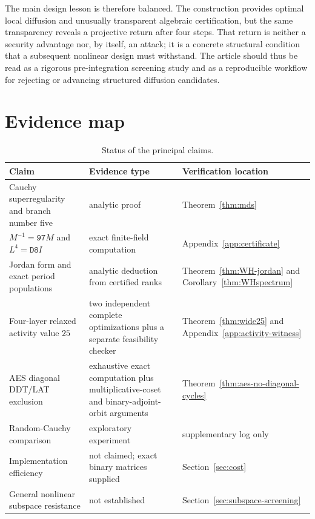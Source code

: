 \documentclass[10pt,reqno]{amsart}
\theoremstyle{plain}
\theoremstyle{remark}\newtheorem{remark}[theorem]{Remark}
\theoremstyle{definition}\newtheorem{definition}[theorem]{Definition}
\begin{document}
The main design lesson is therefore balanced. The construction provides optimal local diffusion and unusually transparent algebraic certification, but the same transparency reveals a projective return after four steps. That return is neither a security advantage nor, by itself, an attack; it is a concrete structural condition that a subsequent nonlinear design must withstand. The article should thus be read as a rigorous pre-integration screening study and as a reproducible workflow for rejecting or advancing structured diffusion candidates.

\section{Evidence map}\label{sec:evidence-map}
\begin{table}[ht]
\centering
\footnotesize
\caption{Status of the principal claims.}
\begin{tabularx}{\textwidth}{p{}p{}X}
\toprule
Claim & Evidence type & Verification location\\
\midrule
Cauchy superregularity and branch number five & analytic proof & Theorem~\ref{thm:mds}\\
$M^{-1}=\mathtt{97}M$ and $L^4=\mathtt{D8}I$ & exact finite-field computation & Appendix~\ref{app:certificate}\\
Jordan form and exact period populations & analytic deduction from certified ranks & Theorem~\ref{thm:WH-jordan} and Corollary~\ref{thm:WHspectrum}\\
Four-layer relaxed activity value $25$ & two independent complete optimizations plus a separate feasibility checker & Theorem~\ref{thm:wide25} and Appendix~\ref{app:activity-witness}\\
AES diagonal DDT/LAT exclusion & exhaustive exact computation plus multiplicative-coset and binary-adjoint-orbit arguments & Theorem~\ref{thm:aes-no-diagonal-cycles}\\
Random-Cauchy comparison & exploratory experiment & supplementary log only\\
Implementation efficiency & not claimed; exact binary matrices supplied & Section~\ref{sec:cost}\\
General nonlinear subspace resistance & not established & Section~\ref{sec:subspace-screening}\\
\bottomrule
\end{tabularx}
\end{table}

\appendix
\end{document}
